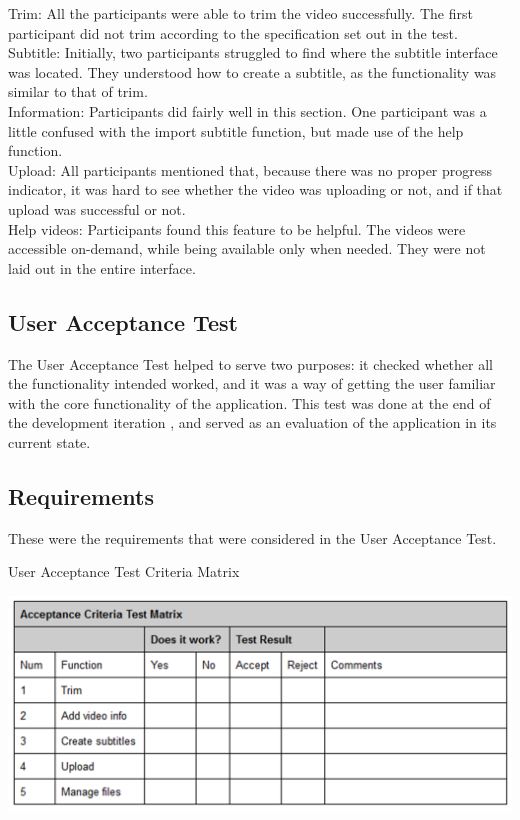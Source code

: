 \documentclass{sig-alternate-05-2015}
\begin{document}
  \noindent
  Trim: All the participants were able to trim the video successfully. The first participant did not trim according to the specification set out in the test.\\
  
  \noindent
  Subtitle: Initially, two participants struggled to find where the subtitle interface was located. They understood how to create a subtitle, as the functionality was similar to that of trim.\\
  
  \noindent
  Information: Participants did fairly well in this section. One participant was a little confused with the import subtitle function, but made use of the help function.\\
  
  \noindent
  Upload: All participants mentioned that, because there was no proper progress indicator, it was hard to see whether the video was uploading or not, and if that upload was successful or not.\\
  
  \noindent
  Help videos: Participants found this feature to be helpful. The videos were accessible on-demand, while being available only when needed. They were not laid out in the entire interface.

\subsection{User Acceptance Test}
The User Acceptance Test helped to serve two purposes: it checked whether all the functionality intended worked, and it was a way of getting the user familiar with the core functionality of the application. This test was done at the end of the development iteration \cite{boltonuser}, and served as an evaluation of the application in its current state.

\subsection*{Requirements}
These were the requirements that were considered in the User Acceptance Test.

\begin{table} [ht]
\caption{User Acceptance Test Criteria Matrix}
\includegraphics[scale=0.23]{uat}
\end{table}
\end{document}
